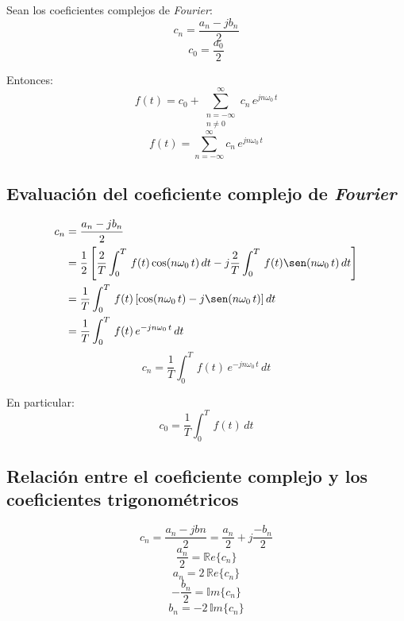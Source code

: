 Sean los coeficientes complejos de \emph{Fourier}:
\begin{equation*}
    c_n=\frac{a_n-jb_n}{2}
\end{equation*}
\begin{equation*}
    c_0=\frac{a_0}{2}
\end{equation*}

Entonces:
\begin{equation*}
    f(t)=c_0+\sum_{\substack{n=-\infty\\n\neq0}}^{\infty}c_n\,e^{jn\omega_0\,t}
\end{equation*}
\begin{equation}
    f(t)=\sum_{n=-\infty}^{\infty}c_n\,e^{jn\omega_0\,t}
\end{equation}

\subsection{Evaluación del coeficiente complejo de \emph{Fourier}}
\begin{equation*}
\begin{split}
    c_n
        &=\frac{a_n-jb_n}{2}\\
        &=\frac{1}{2}\left[
            \frac{2}{T}\int_0^T\,f(t)\cos(n\omega_0\,t)\,dt
            -j\frac{2}{T}\int_0^T\,f(t)\sen(n\omega_0\,t)\,dt
        \right]\\
        &=\frac{1}{T}\int_0^T\,f(t)\left[
            \cos(n\omega_0\,t)-j\sen(n\omega_0\,t)
        \right]dt\\
        &=\frac{1}{T}\int_0^T\,f(t)\,e^{-jn\omega_0\,t}\,dt\\
\end{split}
\end{equation*}
\begin{equation}
    c_n=\frac{1}{T}\int_0^T\,f(t)\,e^{-jn\omega_0\,t}\,dt
\end{equation}

En particular:
\begin{equation}
    c_0=\frac{1}{T}\int_0^T\,f(t)\,dt
\end{equation}

\subsection{Relación entre el coeficiente complejo y los coeficientes
trigonométricos}
\begin{equation*}
    c_n=\frac{a_n-jbn}{2}
        =\frac{a_n}{2}+j\frac{-b_n}{2}
\end{equation*}
\begin{equation*}
    \frac{a_n}{2}=\mathbb{R}e\{c_n\}
\end{equation*}
\begin{equation}
    a_n=2\,\mathbb{R}e\{c_n\}
\end{equation}
\begin{equation*}
    -\frac{b_n}{2}=\mathbb{I}m\{c_n\}
\end{equation*}
\begin{equation}
    b_n=-2\,\mathbb{I}m\{c_n\}
\end{equation}

